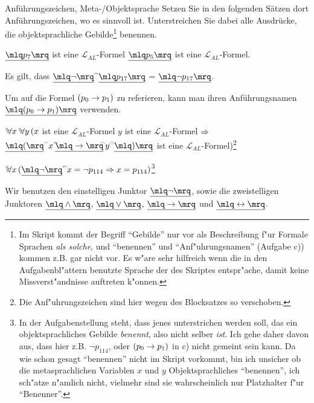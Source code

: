 \documentclass[a4paper,12pt]{scrartcl}
\begin{document}
\begin{task}{Anführungszeichen, Meta-/Objektsprache}
Setzen Sie in den folgenden Sätzen dort Anführungszeichen, wo es sinnvoll ist. Unterstreichen Sie dabei alle Ausdrücke, die objektsprachliche Gebilde\footnote{Im Skript kommt der Begriff "`Gebilde"' nur vor als Beschreibung f"ur Formale Sprachen \emph{als solche}, und "`benennen"' und "`Anf"uhrungsnamen"' (Aufgabe c)) kommen z.B. gar nicht vor. Es w"are sehr hilfreich wenn die in den Aufgabenbl"attern benutzte Sprache der des Skriptes entspr"ache, damit keine Missverst"andnisse auftreten k"onnen.} benennen.
\\
\begin{subtasks}
	\item $\underline{\mq{p_{7}}}$ ist eine $\mathcal{L}_{AL}$-Formel \Land $\underline{\mq{p_{5}}}$ ist eine $\mathcal{L}_{AL}$-Formel.
	\item Es gilt, dass $\underline{\mq{\neg}} \concat \underline{\mq{p_{17}}}$ = $\underline{\mq{\neg p_{17}}}$.
	\item Um auf die Formel $(p_{0} \rightarrow p_{1})$ zu referieren, kann man ihren Anführungsnamen $\underline{\mq{(p_{0} \then p_{1})}}$ verwenden.
	\item $\Forall x \, \Forall y \, (x$ ist eine $\mathcal{L}_{AL}$-Formel \Land $y$ ist eine $\mathcal{L}_{AL}$-Formel $\Rightarrow$ $ \underline{\mq{(}}  \concat x \concat \!\! \underline{\mq{\then}} \!\! \concat y \concat  \underline{\mq{)}} $ ist eine $\mathcal{L}_{AL}$-Formel)\footnote{Die Anf"uhrungszeichen sind hier wegen des Blocksatzes so verschoben.}
	\item $\Forall x \, (\underline{\mq{\neg}} \concat x = \neg p_{114}  \Then x=p_{114})$\footnote{In der Aufgabenstellung steht, dass jenes unterstrichen werden soll, das ein objektsprachliches Gebilde \emph{benennt}, also nicht selber \emph{ist}. Ich gehe daher davon aus, dass hier z.B. $\neg p_{114}$, oder $(p_{0} \rightarrow p_{1})$ in c) nicht gemeint sein kann. Da wie schon gesagt "`benennen"' nicht im Skript vorkommt, bin ich unsicher ob die metasprachlichen Variablen $x$ und $y$ Objektsprachliches "`benennen"', ich sch"atze n"amlich nicht, vielmehr sind sie wahrscheinlich nur Platzhalter f"ur "`Benenner"'.}
	\item Wir benutzen den einstelligen Junktor $\underline{\mq{\neg}}$, sowie die zweistelligen Junktoren $\underline{\mq{\land}}$, $\underline{\mq{\lor}}$, $\underline{\mq{\then}}$ und $\underline{\mq{\eq}}$.
\end{subtasks}
\end{task}
\end{document}

